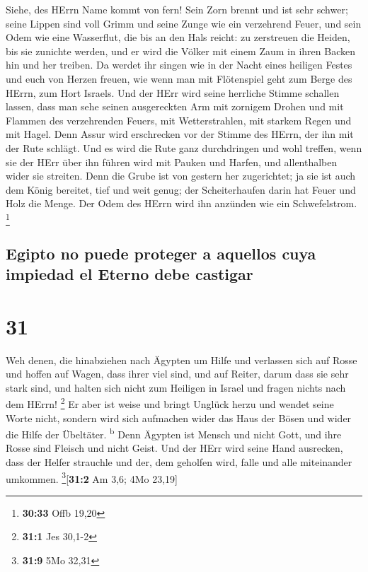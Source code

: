  Siehe, des HErrn Name kommt von fern! Sein Zorn brennt
und ist sehr schwer; seine Lippen sind voll Grimm und seine Zunge wie
ein verzehrend Feuer,  und sein Odem wie eine Wasserflut,
die bis an den Hals reicht: zu zerstreuen die Heiden, bis sie zunichte
werden, und er wird die Völker mit einem Zaum in ihren Backen hin und
her treiben.  Da werdet ihr singen wie in der Nacht eines
heiligen Festes und euch von Herzen freuen, wie wenn man mit Flötenspiel
geht zum Berge des HErrn, zum Hort Israels.  Und der HErr
wird seine herrliche Stimme schallen lassen, dass man sehe seinen
ausgereckten Arm mit zornigem Drohen und mit Flammen des verzehrenden
Feuers, mit Wetterstrahlen, mit starkem Regen und mit Hagel.
 Denn Assur wird erschrecken vor der Stimme des HErrn,
der ihn mit der Rute schlägt.  Und es wird die Rute ganz
durchdringen und wohl treffen, wenn sie der HErr über ihn führen wird
mit Pauken und Harfen, und allenthalben wider sie streiten.
 Denn die Grube ist von gestern her zugerichtet; ja sie
ist auch dem König bereitet, tief und weit genug; der Scheiterhaufen
darin hat Feuer und Holz die Menge. Der Odem des HErrn wird ihn anzünden
wie ein Schwefelstrom. \footnote{\textbf{30:33} Offb 19,20}

\hypertarget{egipto-no-puede-proteger-a-aquellos-cuya-impiedad-el-eterno-debe-castigar}{%
\subsection{Egipto no puede proteger a aquellos cuya impiedad el Eterno
debe
castigar}\label{egipto-no-puede-proteger-a-aquellos-cuya-impiedad-el-eterno-debe-castigar}}

\hypertarget{section-30}{%
\section{31}\label{section-30}}

 Weh denen, die hinabziehen nach Ägypten um Hilfe und
verlassen sich auf Rosse und hoffen auf Wagen, dass ihrer viel sind, und
auf Reiter, darum dass sie sehr stark sind, und halten sich nicht zum
Heiligen in Israel und fragen nichts nach dem HErrn! \footnote{\textbf{31:1}
  Jes 30,1-2}  Er aber ist weise und bringt Unglück herzu
und wendet seine Worte nicht, sondern wird sich aufmachen wider das Haus
der Bösen und wider die Hilfe der Übeltäter. \textsuperscript{b}
 Denn Ägypten ist Mensch und nicht Gott, und ihre Rosse
sind Fleisch und nicht Geist. Und der HErr wird seine Hand ausrecken,
dass der Helfer strauchle und der, dem geholfen wird, falle und alle
miteinander umkommen. \footnote{\textbf{31:9} 5Mo 32,31}{[}\textbf{31:2}
Am 3,6; 4Mo 23,19{]}

